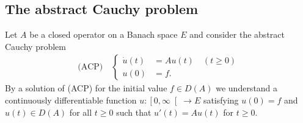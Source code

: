 \subsection{The abstract Cauchy problem} \label{subsec:a2-1.se1}
Let $A$ be a closed operator on a Banach space $E$ and consider the abstract Cauchy problem
\begin{align*}
\text{(ACP)} \quad \begin{cases}
    \dot{u}(t) &= Au(t) \quad (t \geq 0) \\
    u(0) &= f .
\end{cases}
\end{align*}
By a solution of (ACP) for the initial value $f \in D(A)$ we understand a continuously differentiable function $u \colon \left[0,\infty\right[ \to E$ satisfying $u(0) = f$ and $u(t) \in D(A)$ for all $t \geq 0$ such that $u'(t) = Au(t)$ for $t \geq 0$.

